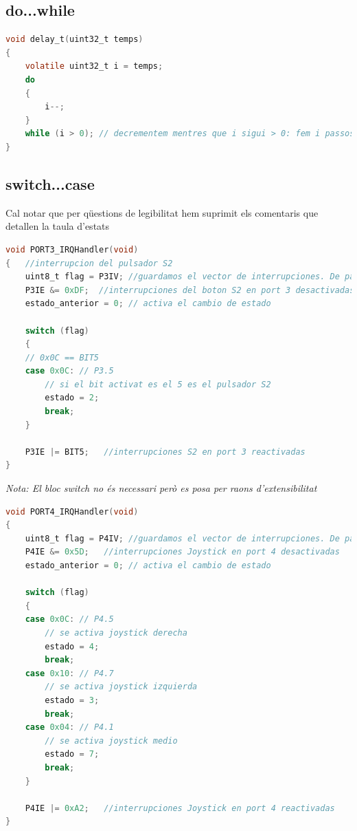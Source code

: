 \documentclass[12pt,a4paper]{article}
\begin{document}
\subsection{do...while}

\begin{lstlisting}[language=C]
void delay_t(uint32_t temps)
{
    volatile uint32_t i = temps;
    do
    {
        i--;
    }
    while (i > 0); // decrementem mentres que i sigui > 0: fem i passos
}
\end{lstlisting}

\subsection{switch...case}

Cal notar que per qüestions de legibilitat hem suprimit els comentaris que detallen la taula d'estats

\begin{lstlisting}[language=C]
void PORT3_IRQHandler(void)
{   //interrupcion del pulsador S2
    uint8_t flag = P3IV; //guardamos el vector de interrupciones. De paso, al acceder a este vector, se limpia automaticamente.
    P3IE &= 0xDF;  //interrupciones del boton S2 en port 3 desactivadas
    estado_anterior = 0; // activa el cambio de estado

    switch (flag)
    {
    // 0x0C == BIT5
    case 0x0C: // P3.5
        // si el bit activat es el 5 es el pulsador S2
        estado = 2;
        break;
    }

    P3IE |= BIT5;   //interrupciones S2 en port 3 reactivadas
}
\end{lstlisting}
\textit{Nota: El bloc switch no és necessari però es posa per raons d'extensibilitat}

\begin{lstlisting}[language=C]
void PORT4_IRQHandler(void)
{
    uint8_t flag = P4IV; //guardamos el vector de interrupciones. De paso, al acceder a este vector, se limpia automaticamente.
    P4IE &= 0x5D;   //interrupciones Joystick en port 4 desactivadas
    estado_anterior = 0; // activa el cambio de estado

    switch (flag)
    {
    case 0x0C: // P4.5
        // se activa joystick derecha
        estado = 4;
        break;
    case 0x10: // P4.7
        // se activa joystick izquierda
        estado = 3;
        break;
    case 0x04: // P4.1
        // se activa joystick medio
        estado = 7;
        break;
    }

    P4IE |= 0xA2;   //interrupciones Joystick en port 4 reactivadas
}
\end{lstlisting}
\end{document}
